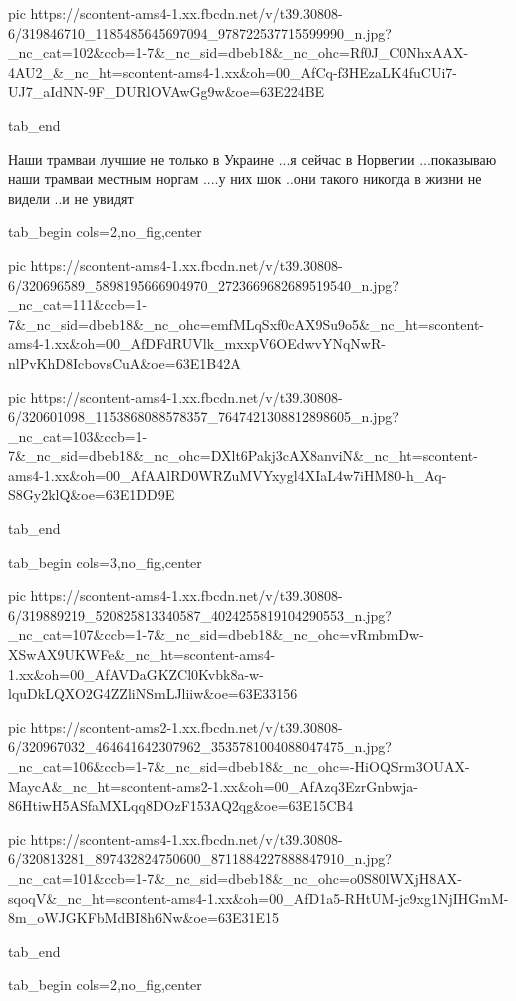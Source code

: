     pic https://scontent-ams4-1.xx.fbcdn.net/v/t39.30808-6/319846710_1185485645697094_978722537715599990_n.jpg?_nc_cat=102&ccb=1-7&_nc_sid=dbeb18&_nc_ohc=Rf0J_C0NhxAAX-4AU2_&_nc_ht=scontent-ams4-1.xx&oh=00_AfCq-f3HEzaLK4fuCUi7-UJ7_aIdNN-9F_DURlOVAwGg9w&oe=63E224BE

  tab_end
\fi



Наши трамваи лучшие не только в Украине ...я сейчас в Норвегии ...показываю
наши трамваи местным норгам ....у них шок ..они такого никогда в жизни не
видели ..и не увидят


\ifcmt
  tab_begin cols=2,no_fig,center

     pic https://scontent-ams4-1.xx.fbcdn.net/v/t39.30808-6/320696589_5898195666904970_2723669682689519540_n.jpg?_nc_cat=111&ccb=1-7&_nc_sid=dbeb18&_nc_ohc=emfMLqSxf0cAX9Su9o5&_nc_ht=scontent-ams4-1.xx&oh=00_AfDFdRUVlk_mxxpV6OEdwvYNqNwR-nlPvKhD8IcbovsCuA&oe=63E1B42A

     pic https://scontent-ams4-1.xx.fbcdn.net/v/t39.30808-6/320601098_1153868088578357_7647421308812898605_n.jpg?_nc_cat=103&ccb=1-7&_nc_sid=dbeb18&_nc_ohc=DXlt6Pakj3cAX8anviN&_nc_ht=scontent-ams4-1.xx&oh=00_AfAAlRD0WRZuMVYxygl4XIaL4w7iHM80-h_Aq-S8Gy2klQ&oe=63E1DD9E

  tab_end
\fi

\ifcmt
  tab_begin cols=3,no_fig,center

    pic https://scontent-ams4-1.xx.fbcdn.net/v/t39.30808-6/319889219_520825813340587_4024255819104290553_n.jpg?_nc_cat=107&ccb=1-7&_nc_sid=dbeb18&_nc_ohc=vRmbmDw-XSwAX9UKWFe&_nc_ht=scontent-ams4-1.xx&oh=00_AfAVDaGKZCl0Kvbk8a-w-lquDkLQXO2G4ZZliNSmLJliiw&oe=63E33156

    pic https://scontent-ams2-1.xx.fbcdn.net/v/t39.30808-6/320967032_464641642307962_3535781004088047475_n.jpg?_nc_cat=106&ccb=1-7&_nc_sid=dbeb18&_nc_ohc=-HiOQSrm3OUAX-MaycA&_nc_ht=scontent-ams2-1.xx&oh=00_AfAzq3EzrGnbwja-86HtiwH5ASfaMXLqq8DOzF153AQ2qg&oe=63E15CB4

    pic https://scontent-ams4-1.xx.fbcdn.net/v/t39.30808-6/320813281_897432824750600_8711884227888847910_n.jpg?_nc_cat=101&ccb=1-7&_nc_sid=dbeb18&_nc_ohc=o0S80lWXjH8AX-sqoqV&_nc_ht=scontent-ams4-1.xx&oh=00_AfD1a5-RHtUM-jc9xg1NjIHGmM-8m_oWJGKFbMdBI8h6Nw&oe=63E31E15

  tab_end
\fi


\ifcmt
  tab_begin cols=2,no_fig,center


